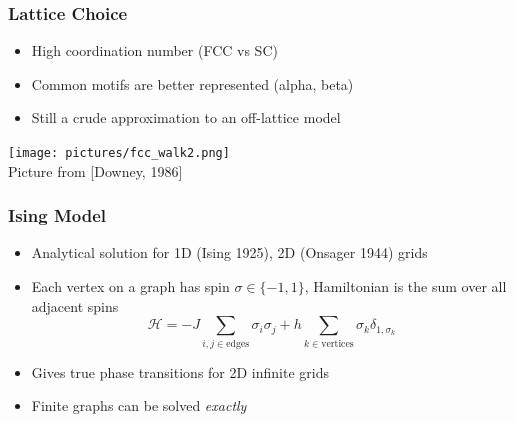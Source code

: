 \documentclass[handout]{beamer} %
\begin{document}
\begin{frame}
\frametitle{Lattice Choice}
\begin{block}{}
\begin{itemize}
\item High coordination number (FCC vs SC)
\item Common motifs are better represented (alpha, beta)
\item Still a crude approximation to an off-lattice model
\end{itemize}
\end{block}

\begin{block}{}
\begin{center}
\texttt{[image: pictures/fcc\_walk2.png]}\\
{\footnotesize Picture from [Downey, 1986]} \\
\end{center}
\end{block}
\end{frame}

\begin{frame}
\frametitle{Ising Model}
\begin{block}{}
\begin{itemize}
\item Analytical solution for 1D (Ising 1925), 2D (Onsager 1944) grids
\item Each vertex on a graph has spin $\sigma \in \{-1, 1\}$, Hamiltonian is the sum over all adjacent spins
$$
\mathcal{H} = -J \sum_{i,j \in \text{edges}} \sigma_i \sigma_j + h \sum_{k \in \text{vertices}} \sigma_k \delta_{1, \sigma_k} 
$$
\item Gives true phase transitions for 2D infinite grids
\item Finite graphs can be solved \textit{exactly}
\end{itemize}
\end{block}
\end{frame}
\end{document}

